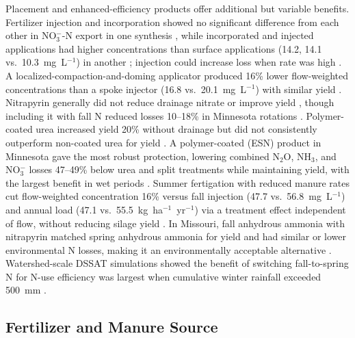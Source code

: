 Placement and enhanced-efficiency products offer additional but variable benefits. Fertilizer injection and incorporation showed no significant difference from each other in NO$_3^-$-N export in one synthesis \parencite{Liu2021}, while incorporated and injected applications had higher concentrations than surface applications (14.2, 14.1 vs.\ 10.3~mg~L$^{-1}$) in another \parencite{Hertzberger2019}; injection could increase loss when rate was high \parencite{Jeong2018}. A localized-compaction-and-doming applicator produced 16\% lower flow-weighted concentrations than a spoke injector (16.8 vs.\ 20.1~mg~L$^{-1}$) with similar yield \parencite{Bakhsh2010}. Nitrapyrin generally did not reduce drainage nitrate or improve yield \parencite{Vetsch2019,Pittelkow2017}, though including it with fall N reduced losses 10--18\% in Minnesota rotations \parencite{Randall2003,Randall2005}. Polymer-coated urea increased yield 20\% without drainage but did not consistently outperform non-coated urea for yield \parencite{Nash2015,Nash2015b}. A polymer-coated (ESN) product in Minnesota gave the most robust protection, lowering combined N$_2$O, NH$_3$, and NO$_3^-$ losses 47--49\% below urea and split treatments while maintaining yield, with the largest benefit in wet periods \parencite{Menegaz2025}. Summer fertigation with reduced manure rates cut flow-weighted concentration 16\% versus fall injection (47.7 vs.\ 56.8~mg~L$^{-1}$) and annual load (47.1 vs.\ 55.5~kg~ha$^{-1}$~yr$^{-1}$) via a treatment effect independent of flow, without reducing silage yield \parencite{Gamble2018}. In Missouri, fall anhydrous ammonia with nitrapyrin matched spring anhydrous ammonia for yield and had similar or lower environmental N losses, making it an environmentally acceptable alternative \parencite{Kaur2024,Kaur2024c}. Watershed-scale DSSAT simulations showed the benefit of switching fall-to-spring N for N-use efficiency was largest when cumulative winter rainfall exceeded 500~mm \parencite{Banger2018}.

\subsection{Fertilizer and Manure Source}

